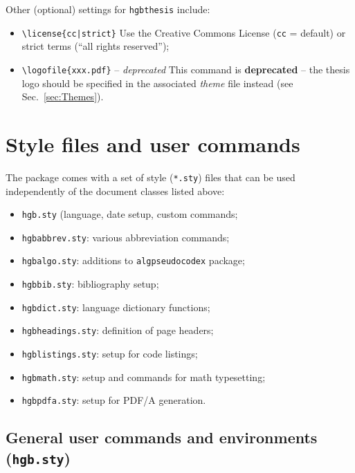 \documentclass[english]{hgbarticle}
\begin{document}
\noindent
Other (optional) settings for \texttt{hgbthesis} include:
\begin{itemize}
    \item \verb!\license{cc|strict}!\newline
    Use the Creative Commons License (\texttt{cc} = default) or strict terms
      (``all rights reserved'');
    \item \verb!\logofile{xxx.pdf}! -- \emph{deprecated}\newline
		This command is \textbf{deprecated} -- the thesis logo 
		should be specified in the associated \emph{theme} file instead (see Sec.~\ref{sec:Themes}).
\end{itemize}

\section{Style files and user commands}

The package comes with a set of style (\texttt{*.sty}) files that can be used
independently of the document classes listed above:
\begin{itemize}
  \item \texttt{hgb.sty} (language, date setup, custom commands;
  \item \texttt{hgbabbrev.sty}: various abbreviation commands;
  \item \texttt{hgbalgo.sty}: additions to \texttt{algpseudocodex} package;
  \item \texttt{hgbbib.sty}: bibliography setup;
  \item \texttt{hgbdict.sty}: language dictionary functions;
  \item \texttt{hgbheadings.sty}: definition of page headers;
  \item \texttt{hgblistings.sty}: setup for code listings;
  \item \texttt{hgbmath.sty}: setup and commands for math typesetting;
  \item \texttt{hgbpdfa.sty}: setup for PDF/A generation.
\end{itemize}

\subsection{General user commands and environments (\texttt{hgb.sty})}
\label{sec:GeneralUserCommands}
\end{document}
